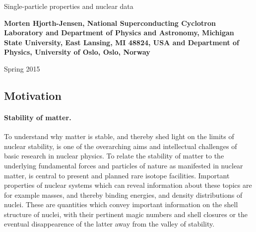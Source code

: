 \documentclass[%
twoside,                 %
final,                   %
10pt]{article}
\begin{document}




\thispagestyle{empty}

\begin{center}
{\LARGE\bf
\begin{spacing}{1.25}
Single-particle properties and nuclear data
\end{spacing}
}
\end{center}


\begin{center}
{\bf Morten Hjorth-Jensen, National Superconducting Cyclotron Laboratory and Department of Physics and Astronomy, Michigan State University, East Lansing, MI 48824, USA and Department of Physics, University of Oslo, Oslo, Norway${}^{}$} \\ [0mm]
\end{center}

    \begin{center}
\end{center}
    

\begin{center} %
Spring 2015
\end{center}

\vspace{1cm}


\subsection*{Motivation}

\paragraph{Stability of matter.}
To understand why matter is stable, and thereby shed light on the limits of 
nuclear stability, is one of the 
overarching aims and intellectual challenges 
of basic research in nuclear physics. To relate the stability of matter
to the underlying fundamental forces and particles of nature as manifested in nuclear matter, is central
to present and planned rare isotope facilities. 
Important properties of nuclear systems which can reveal information about these topics 
are for example masses, and thereby binding energies, and density distributions of nuclei.  
These are quantities which convey important information on 
the shell structure of nuclei, with their 
pertinent magic numbers and shell closures or the  eventual disappearence of the latter 
away from  the valley of stability.
\end{document}
